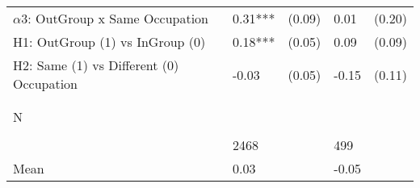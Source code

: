\begin{tabular}{l*{4}{l}}
$\alpha3$: OutGroup x Same Occupation&     0.31***&   (0.09)&     0.01   &   (0.20)\\
 
H1: OutGroup (1) vs InGroup (0)&     0.18***&   (0.05)&     0.09   &   (0.09)\\
 
H2: Same (1) vs Different (0) Occupation&    -0.03   &   (0.05)&    -0.15   &   (0.11)\\
 
  \\\\[-0.5cm] N \\\\[-0.6cm]&     2468   &         &      499   &         \\
Mean            &     0.03&         &    -0.05&         \\
 
\bottomrule  \end{tabular}  
